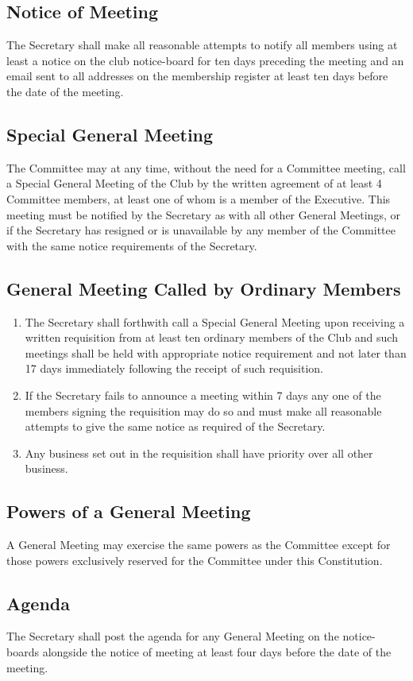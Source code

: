 \documentclass[11pt]{article} %
\begin{document}
\subsection{Notice of Meeting}
The Secretary shall make all reasonable attempts to notify all members using at least a notice on the club notice-board for ten days preceding the meeting and an email sent to all addresses on the membership register at least ten days before the date of the meeting.
\subsection{Special General Meeting}
The Committee may at any time, without the need for a Committee meeting, call a Special General Meeting of the Club by the written agreement of at least 4 Committee members, at least one of whom is a member of the Executive. This meeting must be notified by the Secretary as with all other General Meetings, or if the Secretary has resigned or is unavailable by any member of the Committee with the same notice requirements of the Secretary.

\subsection{General Meeting Called by Ordinary Members}
\begin{enumerate}
	\item The Secretary shall forthwith call a Special General Meeting upon receiving a written requisition from at least ten ordinary members of the Club and such meetings shall be held with appropriate notice requirement and not later than 17 days immediately following the receipt of such requisition.
	\item If the Secretary fails to announce a meeting within 7 days any one of the members signing the requisition may do so and must make all reasonable attempts to give the same notice as required of the Secretary.
	\item Any business set out in the requisition shall have priority over all other business.
\end{enumerate}

\subsection{Powers of a General Meeting}
A General Meeting may exercise the same powers as the Committee except for those powers exclusively reserved for the Committee under this Constitution.
\subsection{Agenda}
The Secretary shall post the agenda for any General Meeting on the notice-boards alongside the notice of meeting at least four days before the date of the meeting.
\end{document}
